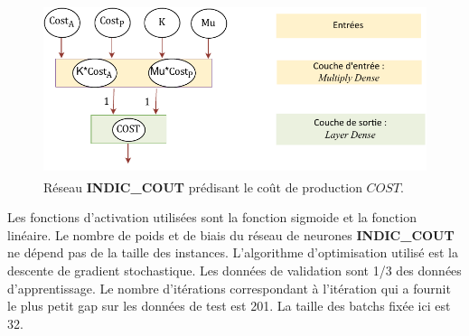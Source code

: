 \begin{figure}[H]
	\centerline{
		\includegraphics[height=5cm]{images_these/PROD_cost_value.pdf}}
	\caption[Réseau INDIC\_COUT prédisant le coût $COST$]{Réseau \textbf{INDIC\_COUT} prédisant le coût de production $COST$.}
	\label{PROD_cost_value}
\end{figure}


 Les fonctions d'activation utilisées sont la fonction sigmoide et la fonction linéaire.
Le nombre de poids et de biais du réseau de neurones \textbf{INDIC\_COUT} ne dépend pas de la taille des instances. L'algorithme d'optimisation utilisé est la descente de gradient stochastique. Les données de validation sont 1/3 des données d'apprentissage. Le nombre d'itérations correspondant à l'itération qui a fournit le plus petit gap sur les données de test est 201. La taille des batchs fixée ici est 32.  %

